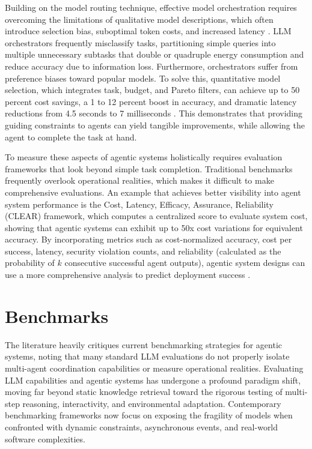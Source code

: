 \documentclass[conference]{IEEEtran}
\begin{document}
Building on the model routing technique, effective model orchestration requires overcoming 
the limitations of qualitative model descriptions, which often introduce selection bias, 
suboptimal token costs, and increased latency \cite{smirnova_cost-aware_2026}. 
LLM orchestrators frequently misclassify tasks, 
partitioning simple queries into multiple unnecessary subtasks that double or quadruple energy 
consumption and reduce accuracy due to information loss. 
Furthermore, orchestrators suffer from preference biases toward popular models. 
To solve this, quantitative model selection, which integrates task, budget, and Pareto filters,
can achieve up to 50 percent cost savings, 
a 1 to 12 percent boost in accuracy, and dramatic latency reductions 
from 4.5 seconds to 7 milliseconds \cite{smirnova_cost-aware_2026}.
This demonstrates that providing guiding constraints to agents can yield tangible improvements,
while allowing the agent to complete the task at hand.

To measure these aspects of agentic systems holistically requires evaluation frameworks that look 
beyond simple task completion. 
Traditional benchmarks frequently overlook operational realities, which makes it difficult to make
comprehensive evaluations.
An example that achieves better visibility into agent system performance is the
Cost, Latency, Efficacy, Assurance, Reliability (CLEAR) framework, which computes a centralized
score to evaluate system cost, showing that agentic systems can exhibit up to 50x cost 
variations for equivalent accuracy. 
By incorporating metrics such as cost-normalized accuracy, cost per success, 
latency, security violation counts, and reliability (calculated as the probability of $k$ 
consecutive successful agent outputs), 
agentic system designs can use a more comprehensive analysis to
predict deployment success \cite{mehta_beyond_2025}.

\section{Benchmarks}
The literature heavily critiques current benchmarking strategies for agentic systems, 
noting that many standard LLM evaluations do not properly isolate multi-agent coordination 
capabilities or measure operational realities.
Evaluating LLM capabilities and agentic systems has undergone a profound
paradigm shift, moving far beyond static knowledge retrieval toward the rigorous testing of
multi-step reasoning, interactivity, and environmental adaptation. 
Contemporary benchmarking frameworks now focus on exposing the fragility of models 
when confronted with dynamic constraints, asynchronous events, and real-world software complexities.
\end{document}
